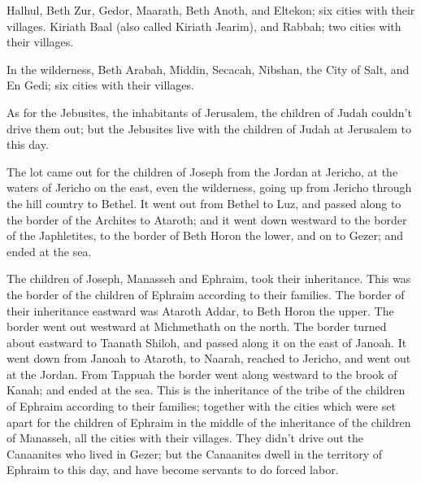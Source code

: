 \myverse{}Halhul, Beth Zur, Gedor,
\myverse{}Maarath, Beth Anoth, and Eltekon; six cities with their villages.
\myverse{}Kiriath Baal (also called Kiriath Jearim), and Rabbah; two cities with their
villages.

\myverse{}In the wilderness, Beth Arabah, Middin, Secacah,
\myverse{}Nibshan, the City of Salt, and En Gedi; six cities with their villages.

\myverse{}As for the Jebusites, the inhabitants of Jerusalem, the children
of Judah couldn’t drive them out; but the Jebusites live with the children of Judah at Jerusalem to this
day.


\mychapter{} \myverse*{}The lot came out for the children of Joseph from the Jordan at
Jericho, at the waters of Jericho on the east, even the wilderness, going up from Jericho through the
hill country to Bethel.
\myverse{}It went out from Bethel to Luz, and passed along to the border of the Archites
to Ataroth;
\myverse{}and it went down westward to the border of the Japhletites, to the border of
Beth Horon the lower, and on to Gezer; and ended at the sea.

\myverse{}The children of Joseph, Manasseh and Ephraim, took their inheritance.
\myverse{}This was the border of the children of Ephraim according to their families.
The border of their inheritance eastward was Ataroth Addar, to Beth Horon the upper.
\myverse{}The border went out westward at Michmethath on the north. The border turned
about eastward to Taanath Shiloh, and passed along it on the east of Janoah.
\myverse{}It went down from Janoah to Ataroth, to Naarah, reached to Jericho, and went
out at the Jordan.
\myverse{}From Tappuah the border went along westward to the brook of Kanah; and ended
at the sea. This is the inheritance of the tribe of the children of Ephraim according to their families;
\myverse{}together with the cities which were set apart for the children of Ephraim in
the middle of the inheritance of the children of Manasseh, all the cities with their villages.
\myverse{}They didn’t drive out the Canaanites who lived in Gezer; but the Canaanites
dwell in the territory of Ephraim to this day, and have become servants to do forced labor.


